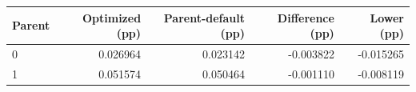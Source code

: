 \begin{tabular}{lrrrr}
\toprule
Parent & Optimized (pp) & Parent-default (pp) & Difference (pp) & Lower (pp) \\
\midrule
0 & 0.026964 & 0.023142 & -0.003822 & -0.015265 \\
1 & 0.051574 & 0.050464 & -0.001110 & -0.008119 \\
\bottomrule
\end{tabular}
